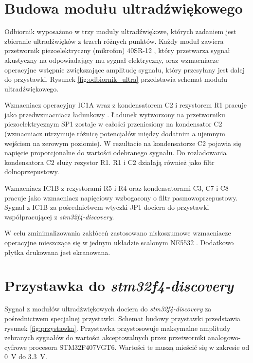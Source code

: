 \section{Budowa modułu ultradźwiękowego}

Odbiornik wyposażono w trzy moduły ultradźwiękowe, których zadaniem jest 
zbieranie ultradźwięków z trzech różnych  punktów.
Każdy moduł zawiera przetwornik piezoelektryczny (mikrofon) 40SR-12 \cite{bib:40ST12},
który przetwarza sygnał akustyczny na odpowiadający mu sygnał elektryczny, oraz wzmacniacze operacyjne 
wstępnie zwiększające amplitudę sygnału, który przesyłany jest dalej do przystawki.
Rysunek \ref{fig:odbiornik_ultra} przedstawia schemat modułu ultradźwiękowego.


Wzmacniacz operacyjny IC1A wraz z kondensatorem C2 i rezystorem R1 pracuje 
jako przedwzmacniacz ładunkowy \cite{bib:wzm_ladunkowy}.
Ładunek wytworzony na przetworniku piezoelektrycznym SP1 zostaje w całości przeniesiony na kondensator C2 
(wzmacniacz utrzymuje różnicę potencjałów między dodatnim a ujemnym wejściem na zerowym poziomie).
W rezultacie na kondensatorze C2 pojawia się napięcie proporcjonalne do wartości odebranego sygnału.
Do rozładowania kondensatora C2 służy rezystor R1.
R1 i C2 działają również jako filtr dolnoprzepustowy.

Wzmacniacz IC1B z rezystorami R5 i R4 oraz kondensatorami C3, C7 i C8 pracuje jako wzmacniacz napięciowy wzbogacony o 
filtr pasmowoprzepustowy.
Sygnał z IC1B za pośrednictwem wtyczki JP1 dociera do przystawki współpracującej z \textit{stm32f4-discovery}.

W celu zminimalizowania zakłóceń zastosowano niskoszumowe wzmacniacze operacyjne
mieszczące się w jednym układzie scalonym NE5532 \cite{bib:ne5532}. 
Dodatkowo płytka drukowana jest ekranowana.


\section{Przystawka do \textit{stm32f4-discovery}}

Sygnał z modułów ultradźwiękowych dociera do \textit{stm32f4-discovery} za pośrednictwem specjalnej przystawki.
Schemat budowy przystawki przedstawia rysunek \ref{fig:przystawka}.
Przystawka przystosowuje maksymalne amplitudy zebranych sygnałów do wartości akceptowalnych przez  
przetworniki analogowo-cyfrowe procesora STM32F407VGT6.
Wartości te muszą mieścić się w zakresie od \SI{0}{V} do \SI{3,3}{V}.

